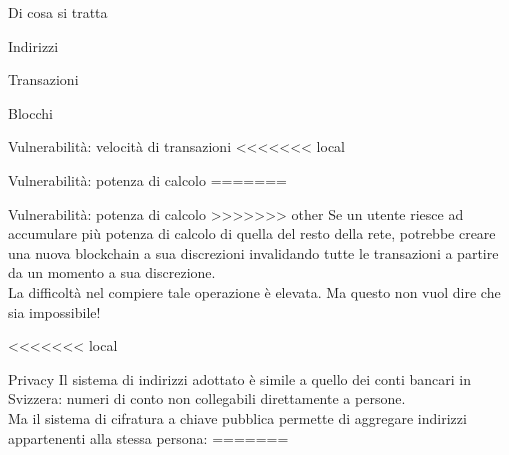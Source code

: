 \documentclass[italian]{beamer}
\begin{document}
\begin{frame}{Di cosa si tratta}
\begin{frame}{Indirizzi}
\begin{frame}{Transazioni}
\begin{frame}{Blocchi}
\begin{frame}{Vulnerabilità: velocità di transazioni}
<<<<<<< local
\begin{frame}{Vulnerabilità: potenza di calcolo} %
=======
\begin{frame}{Vulnerabilità: potenza di calcolo}
>>>>>>> other
 Se un utente riesce ad accumulare più potenza di calcolo di quella del resto della rete, potrebbe creare una nuova blockchain a sua discrezioni invalidando tutte le transazioni a partire da un momento a sua discrezione.\\
 \bigskip
 \pause
 La difficoltà nel compiere tale operazione è elevata.
 \bigskip
 \pause
 Ma questo non vuol dire che sia impossibile!
\end{frame}

<<<<<<< local
\begin{frame}{Privacy} %
Il sistema di indirizzi adottato è simile a quello dei conti bancari in Svizzera: numeri di conto non collegabili direttamente a persone.\\
Ma il sistema di cifratura a chiave pubblica permette di aggregare indirizzi appartenenti alla stessa persona:
=======


\end{frame}
\end{frame}
\end{frame}
\end{frame}
\end{frame}
\end{frame}
\end{frame}
\end{document}
